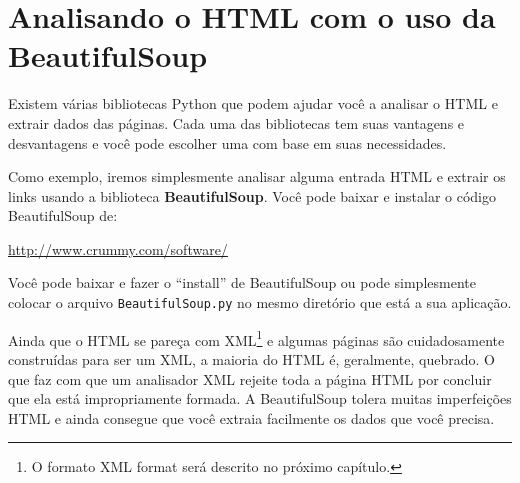 \section{Analisando o HTML com o uso da BeautifulSoup}

Existem várias bibliotecas Python que podem ajudar você a analisar
o HTML e extrair dados das páginas.  Cada uma das bibliotecas
tem suas vantagens e desvantagens e você pode escolher uma com base
em suas necessidades.

Como exemplo, iremos simplesmente analisar alguma entrada HTML 
e extrair os links usando a biblioteca {\bf BeautifulSoup}.   
Você pode baixar e instalar o código BeautifulSoup de:

\url{http://www.crummy.com/software/}

Você pode baixar e fazer o ``install'' de BeautifulSoup ou 
pode simplesmente colocar o arquivo {\tt BeautifulSoup.py} no mesmo
diretório que está a sua aplicação.

Ainda que o HTML se pareça com XML\footnote{O formato XML format será
descrito no próximo capítulo.} e algumas páginas são cuidadosamente 
construídas para ser um XML, a maioria do HTML é, geralmente, quebrado.
O que faz com que um analisador XML rejeite toda a página HTML por
concluir que ela está impropriamente formada. A BeautifulSoup tolera
muitas imperfeições HTML e ainda consegue que você extraia facilmente
os dados que você precisa.

